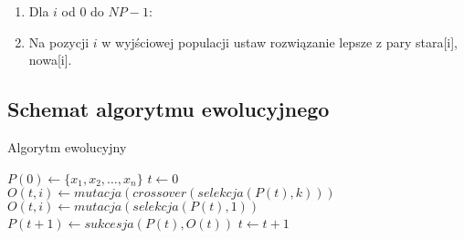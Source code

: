 \documentclass[12pt, a4paper]{article}
\begin{document}
\begin{enumerate}
 \item Dla $i$ od 0 do $NP-1$:
 \item Na pozycji $i$ w wyjściowej populacji ustaw rozwiązanie lepsze z pary stara[i], nowa[i].
\end{enumerate}

\subsection{Schemat algorytmu ewolucyjnego}
\begin{algorithm}[!htb]
\caption{Algorytm ewolucyjny}\label{ea}
\begin{algorithmic}[1]

	\State $P(0) \gets \{x_1, x_2, \ldots, x_n\}$
	\State $t \gets 0$
    			\State $O(t,i) \gets mutacja(crossover(selekcja(P(t),k)))$
    		\Else
    			\State $O(t,i) \gets mutacja(selekcja(P(t),1))$
    		\EndIf
    	\EndFor
    \State $P(t+1) \gets sukcesja(P(t),O(t))$
    \State $t \gets t+1$
  	\EndWhile
\EndFunction
\end{algorithmic}
\end{algorithm}

\nocite{*}


\end{document}
